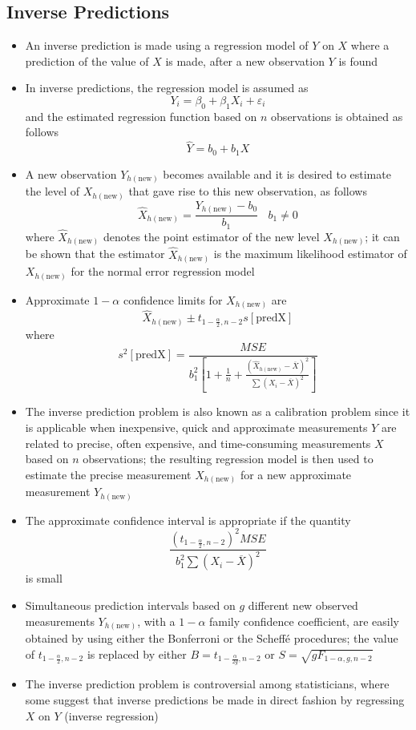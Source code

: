 \subsection{Inverse Predictions}
\begin{itemize} 
\item An inverse prediction is made using a regression model of $Y$ on $X$ where a prediction of the value of $X$ is made, after a new observation $Y$ is found
\item In inverse predictions, the regression model is assumed as $$ Y_i = \beta_0 + \beta_1X_i + \varepsilon_i $$ and the estimated regression function based on $n$ observations is obtained as follows $$ \hat{Y} = b_0 + b_1X $$ 
\item A new observation $Y_{h(\text{new})}$ becomes available and it is desired to estimate the level of $X_{h(\text{new})}$ that gave rise to this new observation, as follows $$ \hat{X}_{h(\text{new})} = \frac{Y_{h(\text{new})} - b_0}{b_1} ~~~~ b_1 \neq 0 $$  where $\hat{X}_{h(\text{new})}$ denotes the point estimator of the new level $X_{h(\text{new})}$; it can be shown that the estimator $\hat{X}_{h(\text{new})}$ is the maximum likelihood estimator of $X_{h(\text{new})}$ for the normal error regression model
\item Approximate $1-\alpha$ confidence limits for $X_{h(\text{new})}$ are $$ \hat{X}_{h(\text{new})} \pm t_{1-\frac{\alpha}{2}, n-2} s[\text{predX}] $$ where $$ s^2[\text{predX}] = \frac{MSE}{b_1^2\left[1 + \frac{1}{n} + \frac{(\hat{X}_{h(\text{new})} - \overline{X})^2}{\sum (X_i - \overline{X})^2}\right]} $$ 
\item The inverse prediction problem is also known as a calibration problem since it is applicable when inexpensive, quick and approximate measurements $Y$ are related to precise, often expensive, and time-consuming measurements $X$ based on $n$ observations; the resulting regression model is then used to estimate the precise measurement $X_{h(\text{new})}$ for a new approximate measurement $Y_{h(\text{new})}$
\item The approximate confidence interval is appropriate if the quantity $$ \frac{(t_{1 - \frac{\alpha}{2}, n-2})^2 MSE}{b_1^2 \sum (X_i - \overline{X})^2} $$ is small
\item Simultaneous prediction intervals based on $g$ different new observed measurements $Y_{h(\text{new})}$, with a $1-\alpha$ family confidence coefficient, are easily obtained by using either the Bonferroni or the Scheffé procedures; the value of $t_{1-\frac{\alpha}{2}, n-2}$ is replaced by either $B = t_{1-\frac{\alpha}{2g}, n-2}$ or $S = \sqrt{gF_{1-\alpha, g, n-2}}$ 
\item The inverse prediction problem is controversial among statisticians, where some suggest that inverse predictions be made in direct fashion by regressing $X$ on $Y$ (inverse regression)
\end{itemize} 


